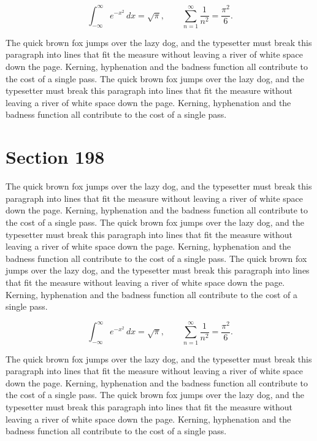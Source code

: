 \documentclass{article}
\begin{document}
\begin{equation}
\int_{-\infty}^{\infty} e^{-x^{2}}\,dx = \sqrt{\pi}, \qquad
\sum_{n=1}^{\infty} \frac{1}{n^{2}} = \frac{\pi^{2}}{6}.
\end{equation}

The quick brown fox jumps over the lazy dog, and the typesetter must break this paragraph into lines that fit the measure without leaving a river of white space down the page. Kerning, hyphenation and the badness function all contribute to the cost of a single pass. The quick brown fox jumps over the lazy dog, and the typesetter must break this paragraph into lines that fit the measure without leaving a river of white space down the page. Kerning, hyphenation and the badness function all contribute to the cost of a single pass. 
\section{Section 198}
The quick brown fox jumps over the lazy dog, and the typesetter must break this paragraph into lines that fit the measure without leaving a river of white space down the page. Kerning, hyphenation and the badness function all contribute to the cost of a single pass. The quick brown fox jumps over the lazy dog, and the typesetter must break this paragraph into lines that fit the measure without leaving a river of white space down the page. Kerning, hyphenation and the badness function all contribute to the cost of a single pass. The quick brown fox jumps over the lazy dog, and the typesetter must break this paragraph into lines that fit the measure without leaving a river of white space down the page. Kerning, hyphenation and the badness function all contribute to the cost of a single pass. 

\begin{equation}
\int_{-\infty}^{\infty} e^{-x^{2}}\,dx = \sqrt{\pi}, \qquad
\sum_{n=1}^{\infty} \frac{1}{n^{2}} = \frac{\pi^{2}}{6}.
\end{equation}

The quick brown fox jumps over the lazy dog, and the typesetter must break this paragraph into lines that fit the measure without leaving a river of white space down the page. Kerning, hyphenation and the badness function all contribute to the cost of a single pass. The quick brown fox jumps over the lazy dog, and the typesetter must break this paragraph into lines that fit the measure without leaving a river of white space down the page. Kerning, hyphenation and the badness function all contribute to the cost of a single pass. 
\end{document}
